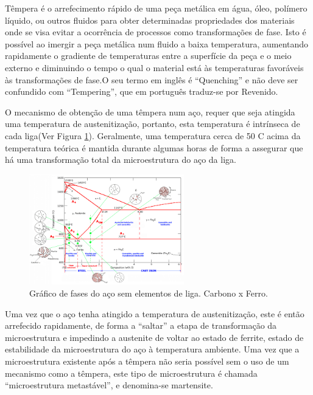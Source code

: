 Têmpera é o arrefecimento rápido de uma peça metálica em água, óleo, polímero líquido, ou outros fluidos para obter determinadas propriedades dos materiais onde se visa evitar a ocorrência de processos como transformações de fase. Isto é possível ao imergir a peça metálica num fluido a baixa temperatura, aumentando rapidamente o gradiente de temperaturas entre a superfície da peça e o meio externo e diminuindo o tempo o qual o material está às temperaturas favoráveis às transformações de fase\cite{Chaus2006}.O seu termo em inglês é “Quenching” e não deve ser confundido com “Tempering”, que em português traduz-se por Revenido.
\par
O mecanismo de obtenção de uma têmpera num aço, requer que seja atingida uma temperatura de austenitização, portanto, esta temperatura é intrínseca de cada liga(Ver Figura \ref{fig:Iron_Carbon_Diagram}). Geralmente, uma temperatura cerca de 50 \textdegree C acima da temperatura teórica é mantida durante algumas horas de forma a assegurar que há uma transformação total da microestrutura do aço da liga.
\begin{figure}[htb]
    \centering
    \includegraphics[width = 0.6\textwidth]{Figures/Cap2/Iron_Carbon_Diagram.png}
    \caption[Gráfico de fases do aço. Carbono x Ferro]%
    {Gráfico de fases do aço sem elementos de liga. Carbono x Ferro\cite{FollSD}. }
    \label{fig:Iron_Carbon_Diagram}
\end{figure}
\par
Uma vez que o aço tenha atingido a temperatura de austenitização, este é então arrefecido rapidamente, de forma a “saltar” a etapa de transformação da microestrutura e impedindo a austenite de voltar ao estado de ferrite, estado de estabilidade da microestrutura do aço à temperatura ambiente. Uma vez que a microestrutura existente após a têmpera não seria possível sem o uso de um mecanismo como a têmpera, este tipo de microestrutura é chamada “microestrutura metastável”, e denomina-se martensite.
